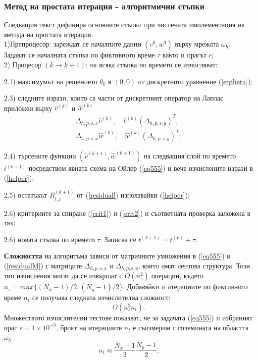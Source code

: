 \documentclass[a4paper]{article}
\newcommand{\be}{\begin{equation}}
\newcommand{\ee}{\end{equation}}
\newcommand{\rf}[1]{(\ref{#1})}
\theoremstyle{remark}
\begin{document}
\begin{large}
\subsubsection{Метод на простата итерация - алгоритмични стъпки}
Следващия текст дефинира основните стъпки при числената имплементация на метода на простата итерация.
\\
1)Препроцесор: зареждат се началните данни $(v^0, w^0)$ върху мрежата $\omega_h$.  Задават се началната стъпка по фиктивното време $\tau$ както и прагът $\epsilon$;
\\
2) Процесор $(k \rightarrow k+1)$: на всяка стъпка по времето се изчисляват: 
\par
2.1) максимумът на решението $\theta_k$ в $(0,0)$  от дискретното уравнение \rf{eqtheta};
\par
2.3) следните изрази, които са части от дискретният оператор на Лаплас приложен върху $\widehat{v}^{(k)}$ и $\widehat{w}^{(k)}$
\begin{align}\label{helper}
\Delta_{h,p,s,x}  \widehat{v}^{(k)}, \quad \widehat{v}^{(k)}  (\Delta_{h,p,s,y})^T, \nonumber\\
\Delta_{h,p,s,x}  \widehat{w}^{(k)},\quad  \widehat{w}^{(k)}  (\Delta_{h,p,s,y})^T;
\end{align}
\par
2.4) търсените функции $(\widehat{v}^{(k+1)}, \widehat{w}^{(k+1)})$  на следващия слой по времето $t^{(k+1)}$ посредством явната схема на Ойлер \rf{eq555} и вече изчислените изрази в \rf{helper};
\par
2.5) остатъкът $R^{(k+1)}_{i,j}$ от \rf{residual} използвайки \rf{helper};
\par
2.6) критериите за спиране  \rf{crit1} и \rf{crit2} и съответната проверка заложена в тях;
\par
2.6) новата стъпка по времето $\tau$. Записва се $t^{(k+1)}=t^{(k)}+\tau$.

\textbf{Сложността} на алгоритъма зависи от матричните умножения в \rf{eq555} и \rf{residualM} с матриците $\Delta_{h,p,s,x}$ и $\Delta_{h,p,s,y}$, които имат лентова структура. Този тип изчисления могат да се извършат с $O(n_z^2)$ операции, където $n_z = max\{(N_x-1)/2, (N_y-1)/2\}$.  Добавяйки и итерациите по фиктивното време $n_t$ се получава следната изчислителна сложност:
\be\label{complexElpt}
O(n_z^2 n_t).
\ee
Множеството изчислителни тестове показват, че за задачата \rf{eq555} и избраният праг $\epsilon = 1 \times 10^{-9}$, броят на итерациите $n_t$ е съизмерим с големината на областта $\omega_h$
\be
n_t \approx \frac{N_x-1}{2} \frac{N_y-1}{2}.
\ee


\end{large}
\end{document}
